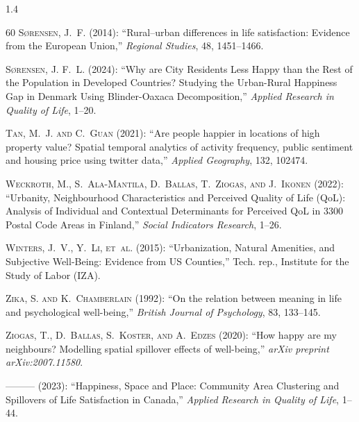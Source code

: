 \documentclass[10pt, letterpaper]{article}
\begin{document}
\begin{spacing}{1.4}
\begin{thebibliography}{60}
\textsc{S{\o}rensen, J.~F.} (2014): \enquote{Rural--urban differences in life
  satisfaction: Evidence from the European Union,} \emph{Regional Studies}, 48,
  1451--1466.

\textsc{S{\o}rensen, J. F.~L.} (2024): \enquote{Why are City Residents Less
  Happy than the Rest of the Population in Developed Countries? Studying the
  Urban-Rural Happiness Gap in Denmark Using Blinder-Oaxaca Decomposition,}
  \emph{Applied Research in Quality of Life}, 1--20.

\textsc{Tan, M.~J. and C.~Guan} (2021): \enquote{Are people happier in
  locations of high property value? Spatial temporal analytics of activity
  frequency, public sentiment and housing price using twitter data,}
  \emph{Applied Geography}, 132, 102474.

\textsc{Weckroth, M., S.~Ala-Mantila, D.~Ballas, T.~Ziogas, and J.~Ikonen}
  (2022): \enquote{Urbanity, Neighbourhood Characteristics and Perceived
  Quality of Life (QoL): Analysis of Individual and Contextual Determinants for
  Perceived QoL in 3300 Postal Code Areas in Finland,} \emph{Social Indicators
  Research}, 1--26.

\textsc{Winters, J.~V., Y.~Li, et~al.} (2015): \enquote{Urbanization, Natural
  Amenities, and Subjective Well-Being: Evidence from US Counties,} Tech. rep.,
  Institute for the Study of Labor (IZA).

\textsc{Zika, S. and K.~Chamberlain} (1992): \enquote{On the relation between
  meaning in life and psychological well-being,} \emph{British Journal of
  Psychology}, 83, 133--145.

\textsc{Ziogas, T., D.~Ballas, S.~Koster, and A.~Edzes} (2020): \enquote{How
  happy are my neighbours? Modelling spatial spillover effects of well-being,}
  \emph{arXiv preprint arXiv:2007.11580}.

---\hspace{-.1pt}---\hspace{-.1pt}--- (2023): \enquote{Happiness, Space and
  Place: Community Area Clustering and Spillovers of Life Satisfaction in
  Canada,} \emph{Applied Research in Quality of Life}, 1--44.


\end{thebibliography}
\end{spacing}
\end{document}
